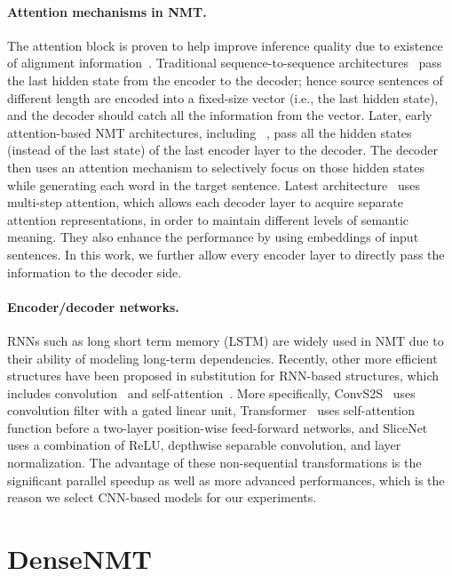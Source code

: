 \documentclass[11pt,a4paper]{article}
\begin{document}
\paragraph{Attention mechanisms in NMT.}
The attention block is proven to help improve inference quality due to existence of alignment information~\cite{bahdanau2014neural}. 
Traditional sequence-to-sequence architectures~\cite{kalchbrenner2013recurrent,cho2014learning} pass the last hidden state from the encoder to the decoder; hence source sentences of different length are encoded into a fixed-size vector (i.e., the last hidden state), and the decoder should catch all the information from the vector. 
Later, early attention-based NMT architectures, including ~\cite{bahdanau2014neural}, pass all the hidden states (instead of the last state) of the last encoder layer to the decoder. The decoder then uses an attention mechanism to selectively focus on those hidden states while generating each word in the target sentence.
Latest architecture~\cite{convs2s} uses multi-step attention, which allows each decoder layer to acquire separate attention representations, in order to maintain different levels of semantic meaning. They also enhance the performance by using embeddings of input sentences. 
In this work, we further allow every encoder layer to directly pass the information to the decoder side. 

\paragraph{Encoder/decoder networks.}
RNNs such as long short term memory (LSTM) are widely used in NMT due to their ability of modeling long-term dependencies. 
Recently, other more efficient structures have been proposed in substitution for RNN-based structures, which includes convolution~\cite{convs2s,slicenet} and self-attention~\cite{transformer}. 
More specifically, ConvS2S~\cite{convs2s} uses convolution filter with a gated linear unit, Transformer~\cite{transformer} uses self-attention function before a two-layer position-wise feed-forward networks, and SliceNet~\cite{slicenet} uses a combination of ReLU, depthwise separable convolution, and layer normalization.  
The advantage of these non-sequential transformations is the significant parallel speedup as well as more advanced performances, which is the reason we select CNN-based models for our experiments.

\section{DenseNMT}
\end{document}
